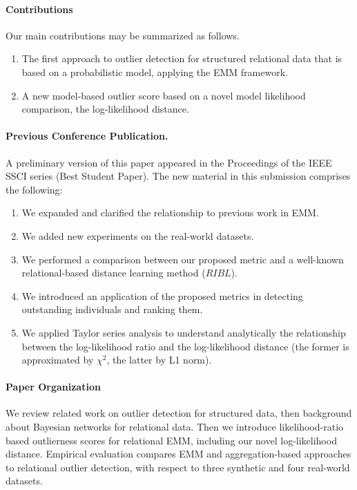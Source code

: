 {\paragraph{Contributions} Our main contributions may be 
summarized as follows.

\begin{enumerate} 
	\item The first approach to outlier detection for structured relational data that is based on a probabilistic model, applying the EMM framework.
	\item A new model-based outlier score based on a novel model likelihood comparison, the log-likelihood distance.  %
\end{enumerate}
				
				\paragraph{Previous Conference Publication.} A preliminary version of this paper appeared in the Proceedings of the IEEE SSCI series \cite{Riahi2015} (Best Student Paper). The new material in this submission comprises the following:
				
				\begin{enumerate} 
				\item We expanded and clarified the relationship to previous work in EMM.
					\item We added new experiments on the real-world datasets.
					\item We performed a comparison between our proposed metric and a well-known relational-based distance learning method ($\textit{RIBL}$).
					\item We introduced an application of the proposed metrics in detecting outstanding individuals and ranking them.
					\item We applied Taylor series analysis to understand analytically the relationship between the log-likelihood ratio and the log-likelihood distance (the former is approximated by $\chi^{2}$, the latter by L1 norm). 
				\end{enumerate}

\paragraph{Paper Organization} We review related work on outlier detection for structured data, then background about Bayesian networks for relational data. Then we introduce likelihood-ratio based outlierness scores for relational EMM, including our novel log-likelihood distance. 
Empirical evaluation compares EMM and aggregation-based approaches to relational outlier detection, with respect to three synthetic and four real-world datasets.

}
